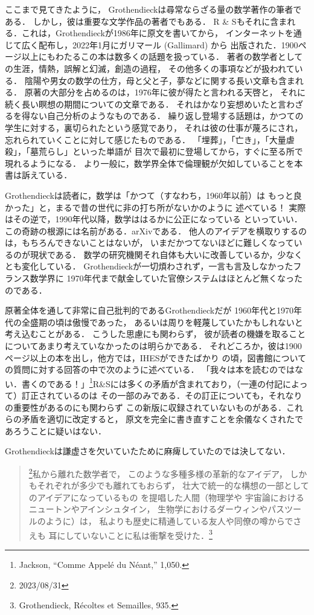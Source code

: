 \documentclass[9pt, a4paper, dvipdfmx]{jlreq}
\theoremstyle{definition}
\theoremstyle{mystyle}
\numberwithin{equation}{section} %
\begin{document}
ここまで見てきたように，
Grothendieckは尋常ならざる量の数学著作の筆者である．
しかし，彼は重要な文学作品の著者でもある．
R \& Sもそれに含まれる．これは，Grothendieckが1986年に原文を書いてから，
インターネットを通じて広く配布し，2022年1月にガリマール (Gallimard) から
出版された．1900ページ以上にもわたるこの本は数多くの話題を扱っている．
著者の数学者としての生涯，情熱，誤解と幻滅，創造の過程，
その他多くの事項などが扱われている．
陰陽や男女の数学の仕方，母と父と子，夢などに関する長い文章も含まれる．
原著の大部分を占めるのは，1976年に彼が得たと言われる天啓と，
それに続く長い瞑想の期間についての文章である．
それはかなり妄想めいたと言わざるを得ない自己分析のようなものである．
繰り返し登場する話題は，かつての学生に対する，裏切られたという感覚であり，
それは彼の仕事が蔑ろにされ，忘れられていくことに対して感じたものである．
「埋葬」，「亡き」，「大量虐殺」，「墓荒らし」といった単語が
目次で最初に登場してから，すぐに至る所で現れるようになる．
より一般に，数学界全体で倫理観が欠如していることを本書は訴えている．

Grothendieckは読者に，数学は「かつて（すなわち，1960年以前）は
もっと良かった」と，まるで昔の世代に非の打ち所がないかのように
述べている！
実際はその逆で，1990年代以降，数学ははるかに公正になっている
といっていい．この奇跡の根源には名前がある．arXivである．
他人のアイデアを横取りするのは，もちろんできないことはないが，
いまだかつてないほどに難しくなっているのが現状である．
数学の研究機関それ自体も大いに改善しているか，少なくとも変化している．
Grothendieckが一切煩わされず，一言も言及しなかったフランス数学界に
1970年代まで献金していた官僚システムはほとんど無くなったのである．

原著全体を通して非常に自己批判的であるGrothendieckだが
1960年代と1970年代の全盛期の頃は傲慢であった，
あるいは周りを軽蔑していたかもしれないと考え込むことがある．
こうした思慮にも関わらず，
彼が読者の機嫌を取ることについてあまり考えていなかったのは明らかである．
それどころか，彼は1900ページ以上の本を出し，他方では，IHESができたばかり
の頃，図書館についての質問に対する回答の中で次のように述べている．
「我々は本を読むのではない．書くのである！」\footnote[18]{
    Jackson, ``Comme Appel\'e du N\'eant,'' 1,050.
}R\&Sには多くの矛盾が含まれており，（一連の付記によって）訂正されているのは
その一部のみである．その訂正についても，それなりの重要性があるのにも関わらず
この新版に収録されていないものがある．これらの矛盾を適切に改定すると，
原文を完全に書き直すことを余儀なくされたであろうことに疑いはない．

Grothendieckは謙虚さを欠いていたために麻痺していたのでは決してない．
\begin{quotation}
    \footnote{2023/08/31}私から離れた数学者で，
    このような多種多様の革新的なアイデア，
    しかもそれぞれが多少でも離れてもおらず，
    壮大で統一的な構想の一部としてのアイデアになっているもの
    を提唱した人間（物理学や
    宇宙論におけるニュートンやアインシュタイン，
    生物学におけるダーウィンやパスツールのように）は，
    私よりも歴史に精通している友人や同僚の噂からでさえも
    耳にしていないことに私は衝撃を受けた．\footnote[19]{
        Grothendieck, R\'ecoltes et Semailles, 935.
    }
\end{quotation}
\end{document}
